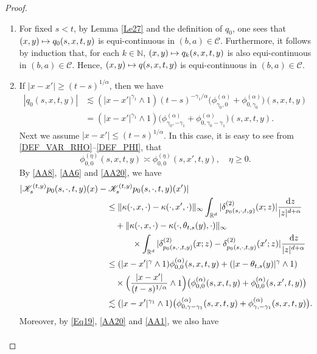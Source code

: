 \documentclass[11pt]{article}
\numberwithin{equation}{section}\providecommand{\asymp}{\mathrel{\sim}}
\def\mto{\mathchoice{\longmapsto}{\mapsto}{\mapsto}{\mapsto}}
\theoremstyle{plain}
\theoremstyle{definition}
\newcommand\mN{\mathbb{N}}
\newcommand\mR{\mathbb{R}}
\newcommand\1{{\mathbf{1}}}
\newcommand\sC{{\mathscr C}}
\newcommand\sK{{\mathscr K}}
\newcommand{\dif}{\,\mathrm{d}}
\begin{document}
\begin{proof}
\begin{enumerate}
\item
For fixed $s<t$, by Lemma \ref{Le27} and the definition of $q_0$, one sees that $(x,y)\mto q_0(s,x,t,y)$ is equi-continuous in $(b,a)\in\sC$.
Furthermore, it follows by induction that, for each $k\in\mN$,
$(x,y)\mto q_k(s,x,t,y)$ is also equi-continuous in $(b,a)\in\sC$. Hence,
$(x,y)\mto q(s,x,t,y)$ is equi-continuous in $(b,a)\in\sC$.

\item
If $|x-x'|\geq (t-s)^{1/\alpha}$, then we have
\begin{align*}
|q_0(s,x,t,y)|&\lesssim (|x-x'|^{\gamma_1}\wedge 1)(t-s)^{-\gamma_1/\alpha}\bigl(\phi^{(\alpha)}_{\gamma_0,0}+\phi^{(\alpha)}_{0,\gamma_0}\bigr)(s,x,t,y)
\\&=(|x-x'|^{\gamma_1}\wedge 1)\bigl(\phi^{(\alpha)}_{\gamma_0,-\gamma_1}+\phi^{(\alpha)}_{0,\gamma_0-\gamma_1}\bigr)(s,x,t,y).
\end{align*}
Next we assume $|x-x'|\leq (t-s)^{1/\alpha}$. In this case, it is easy to see from \eqref{DEF_VAR_RHO}--\eqref{DEF_PHI}, that
\begin{equation}\label{AA20}
\phi^{(\eta)}_{0,0}(s,x,t,y)\asymp\phi^{(\eta)}_{0,0}(s,x',t,y),\quad \eta\geq 0.
\end{equation}
By \eqref{AA8}, \eqref{AA6} and \eqref{AA20}, we have
\begin{align*}
|\sK^{(t,y)}_{s}p_0(s,\cdot,t,y)(x)&-\sK^{(t,y)}_{s}p_0(s,\cdot,t,y)(x')|
\\&\quad\leq \|\kappa(\cdot,x,\cdot)-\kappa(\cdot,x',\cdot)\|_\infty \int_{\mR^d}|\delta^{(2)}_{p_0(s,\cdot,t,y)}(x;z)|\frac{\dif z}{|z|^{d+\alpha}}
\\&\qquad+\|\kappa(\cdot,x,\cdot)-\kappa(\cdot,\theta_{t,s}(y),\cdot)\|_\infty
\\&\qquad\qquad\times\int_{\mR^d}|\delta^{(2)}_{p_0(s,\cdot,t,y)}(x;z)-\delta^{(2)}_{p_0(s,\cdot,t,y)}(x';z)|\frac{\dif z}{|z|^{d+\alpha}}
\\&\quad\leq (|x-x'|^{\gamma}\wedge 1)\phi^{(\alpha)}_{0,0}(s,x,t,y)+(|x-\theta_{t,s}(y)|^\gamma\wedge 1)
\\&\qquad\times\Bigl(\frac{|x-x'|}{(t-s)^{1/\alpha}}\wedge 1\Bigr)\bigl(\phi^{(\alpha)}_{0,0}(s,x,t,y)+\phi^{(\alpha)}_{0,0}(s,x',t,y)\bigr)
\\&\quad\lesssim (|x-x'|^{\gamma_1}\wedge 1)\bigl(\phi^{(\alpha)}_{0,\gamma-\gamma_1}(s,x,t,y)+\phi^{(\alpha)}_{\gamma,-\gamma_1}(s,x,t,y)\bigr){.}
\end{align*}
Moreover, by \eqref{Eq19}, \eqref{AA20} and \eqref{AA1}, we also have
\begin{align*}

\end{align*}
\end{enumerate}
\end{proof}
\end{document}
